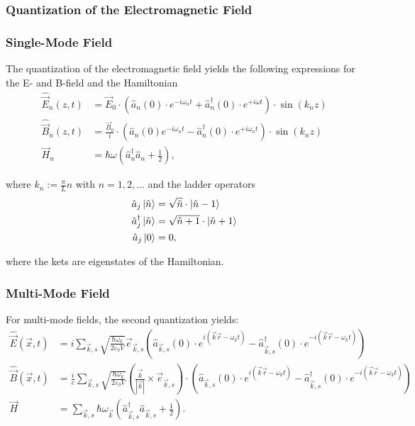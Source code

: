 \documentclass{article}
\newcommand{\lr}[1]{\left(#1\right)}
\begin{document}
\newpage


\subsubsection{Quantization of the Electromagnetic Field}
\subsubsection*{Single-Mode Field}
The quantization of the electromagnetic field yields the following expressions for the E- and B-field and the Hamiltonian
	\begin{align}
		\hat{\vec{E}}_n(z,t) &= \vec{E}_0 \cdot \lr{ \hat{a}_n(0) \cdot e^{-i\omega_n t} + \hat{a}_n^\dagger(0) \cdot e^{+i\omega t} } \cdot \sin(k_n z) \\
		\hat{\vec{B}}_n(z,t) &= \frac{\vec{B}_0}{i} \cdot \lr{ \hat{a}_n(0) e^{-i\omega_n t} - \hat{a}_n^\dagger(0) \cdot e^{+i\omega_n t} } \cdot \sin(k_n z) \\
		\vec{H}_n &= \hbar\omega \lr{ \hat{a}_n^\dagger \hat{a}_n + \frac{1}{2} },
	\end{align}

where $k_n := \frac{\pi}{L} n$ with $n = 1,2,...$ and the ladder operators
	\begin{align}
		\hat{a}_j \ket{\tilde{n}} &= \sqrt{\tilde{n}} \cdot \ket{\tilde{n}-1} \\
		\hat{a}_j^\dagger \ket{\tilde{n}} &= \sqrt{\tilde{n}+1} \cdot \ket{\tilde{n}+1} \\
		\hat{a}_j \ket{0} &= 0,
	\end{align}

where the kets are eigenstates of the Hamiltonian.


\subsubsection*{Multi-Mode Field}
For multi-mode fields, the second quantization yields:
	\begin{align}
		\hat{\vec{E}}(\vec{x},t) &= i \sum_{\vec{k},s} \sqrt{ \frac{\hbar \omega_k }{ 2\varepsilon_0 V } } \vec{e}_{\vec{k},s} \lr{ \hat{a}_{\vec{k},s}(0) \cdot e^{i(\vec{k}\vec{r} - \omega_k t)} - \hat{a}_{\vec{k},s}^\dagger(0) \cdot e^{-i(\vec{k}\vec{r} - \omega_k t)} } \\
		\hat{\vec{B}}(\vec{x},t) &= \frac{i}{c} \sum_{\vec{k},s} \sqrt{ \frac{\hbar \omega_k }{ 2\varepsilon_0 V } } \lr{ \frac{\vec{k}}{|\vec{k}|} \times \vec{e}_{\vec{k},s} } \cdot \lr{ \hat{a}_{\vec{k},s}(0) \cdot e^{i(\vec{k}\vec{r} - \omega_k t)} - \hat{a}_{\vec{k},s}^\dagger(0) \cdot e^{-i(\vec{k}\vec{r} - \omega_k t)} } \\
		\vec{H} &= \sum_{\vec{k},s} \hbar\omega_{\vec{k}}\lr{ \hat{a}_{\vec{k},s}^\dagger \hat{a}_{\vec{k},s} + \frac{1}{2} }.
	\end{align}
\end{document}
